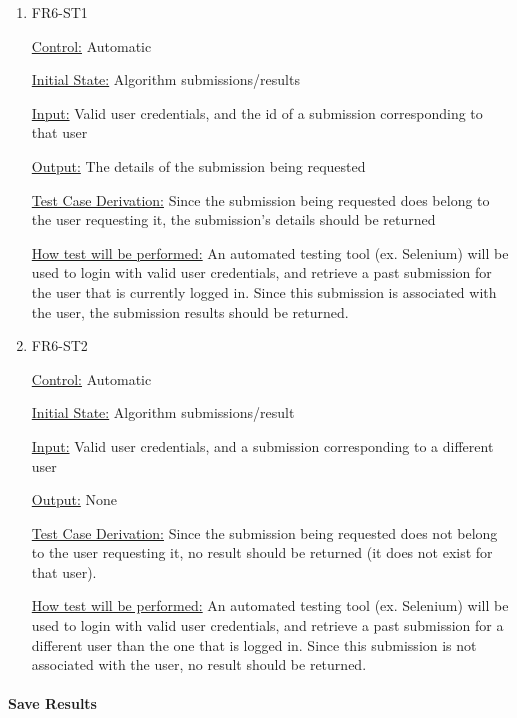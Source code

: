 \documentclass[12pt, titlepage]{article}
\begin{document}
\begin{enumerate}

\item{FR6-ST1\\}

\underline{Control:} Automatic

\underline{Initial State:} Algorithm submissions/results

\underline{Input:} Valid user credentials, and the id of a submission corresponding to that user

\underline{Output:} The details of the submission being requested

\underline{Test Case Derivation:} Since the submission being requested does belong to the user requesting it, the submission’s details should be returned

\underline{How test will be performed:} An automated testing tool (ex. Selenium) will be used to login with valid user credentials, and retrieve a past submission for the user that is currently logged in. Since this submission is associated with the user, the submission results should be returned.
					
\item{FR6-ST2\\}

\underline{Control:} Automatic

\underline{Initial State:} Algorithm submissions/result

\underline{Input:} Valid user credentials, and a submission corresponding to a different user

\underline{Output:} None

\underline{Test Case Derivation:} Since the submission being requested does not belong to the user requesting it, no result should be returned (it does not exist for that user).

\underline{How test will be performed:} An automated testing tool (ex. Selenium) will be used to login with valid user credentials, and retrieve a past submission for a different user than the one that is logged in. Since this submission is not associated with the user, no result should be returned.

\end{enumerate}

\paragraph{Save Results}
\end{document}
